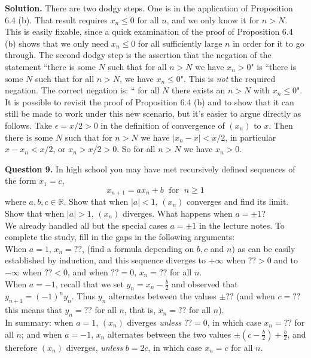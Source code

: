 \documentclass[12pt]{article}
\begin{document}
\medskip
{\bf Solution.} There are two dodgy steps. One is in the application of Proposition 6.4 (b). That result requires $x_n \leq 0$ for all $n$, and we only know it for $n > N$. This is easily fixable, since a quick examination of the proof of Proposition 6.4 (b) shows that we only need $x_n \leq 0$ for all sufficiently large $n$ in order for it to go through. The second dodgy step is the assertion that the negation of the statement ``there is some $N$ such that for all $n>N$ we have $x_n > 0$" is ``there is some $N$ such that for all $n >N$, we have $x_n \leq 0$". This is {\em not} the required negation. The correct negation is: ``
for all $N$ there exists an $n >N$ with $x_n \leq 0$". It is possible to revisit the proof of Proposition 6.4 (b) and to show that it can still be made to work under this new scenario, but it's easier to argue directly as follows. Take $\epsilon = x/2 > 0$ in the definition of convergence of $(x_n)$ to $x$. Then there is some $N$ such that for $n > N$ we have $|x_n - x| < x/2$, in particular $ x - x_n < x/2$, or $x_n > x/2 > 0$. So for all $n > N$ we have $x_n > 0$.

\bigskip
{\bf Question 9.}
In high school you may have met recursively defined sequences of the form $x_1 = c$, 
\[ x_{n+1} = a x_n +b \; \mbox{ for } \; n \geq 1\]
where $a, b, c \in \mathbb{R}$. Show that when $|a| < 1$, $(x_n)$ converges and find its limit. Show that when $|a|>1$, $(x_n)$ diverges. What happens when $a = \pm 1$? 
\\

We already handled all but the special cases $a = \pm 1$ in the lecture notes. To complete the study, fill in the gaps in the following arguments:\\

When $a = 1$, $x_n = ??$, (find a formula depending on $b, c$ and $n$) as can be easily established by induction, and this sequence diverges to $+\infty$ when $ ?? >0$ and to $- \infty$ when $?? < 0$, and when $??= 0$, $x_n = ??$ for all $n$. \\

When $a = -1$, recall that we set $y_n = x_n - \frac{b}{2}$ and observed that $y_{n+1} = (-1)^n y_n$. Thus $y_n$ alternates between the values $\pm ?? $ (and when $c= ??$ this means that $y_n = ??$ for all $n$, that is, $x_n = ?? $ for all $n$).\\

\medskip
In summary: when $a = 1$, $(x_n)$ diverges {\em unless} $??=0$, in which case $x_n = ??$ for all $n$; and when $a = -1$, $x_n$ alternates between the two values $\pm (c - \frac{b}{2}) + \frac{b}{2}$, and therefore $(x_n)$ diverges, {\em unless} $b = 2c$, in which case $x_n = c$ for all $n$.
\end{document}
